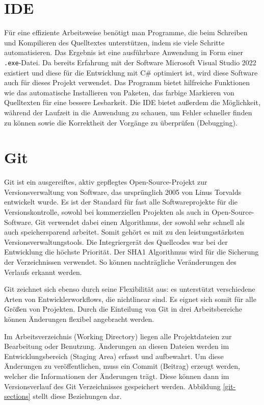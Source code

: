 \section{IDE}
Für eine effiziente Arbeitsweise benötigt man Programme, die beim Schreiben und Kompilieren des Quelltextes unterstützen, indem sie viele Schritte automatisieren.
Das Ergebnis ist eine ausführbare Anwendung in Form einer \texttt{.exe}-Datei. 
Da bereits Erfahrung mit der Software Microsoft Visual Studio 2022 existiert und diese für die Entwicklung mit C\# optimiert ist, wird diese Software auch für dieses Projekt verwendet. 
Das Programm bietet hilfreiche Funktionen wie das automatische Installieren von Paketen, das farbige Markieren von Quelltexten für eine bessere Lesbarkeit. 
Die IDE bietet außerdem die Möglichkeit, während der Laufzeit in die Anwendung zu schauen, um Fehler schneller finden zu können sowie die Korrektheit der Vorgänge zu überprüfen (Debugging).

\section{Git}
Git ist ein ausgereiftes, aktiv gepflegtes Open-Source-Projekt zur Versionsverwaltung von Software, das ursprünglich 2005 von Linus Torvalds entwickelt wurde.
Es ist der Standard für fast alle Softwareprojekte für die Versionskontrolle, sowohl bei kommerziellen Projekten als auch in Open-Source-Software.
Git verwendet dabei einen Algorithmus, der sowohl sehr schnell als auch speichersparend arbeitet.
Somit gehört es mit zu den leistungsstärksten Versionsverwaltungstools.
Die Integriergerät des Quellcodes war bei der Entwicklung die höchste Priorität. 
Der SHA1 Algorithmus wird für die Sicherung der Verzeichnissen verwendet. 
So können nachträgliche Veränderungen des Verlaufs erkannt werden.

Git zeichnet sich ebenso durch seine Flexibilität aus: es unterstützt verschiedene Arten von Entwicklerworkflows, die nichtlinear sind. 
Es eignet sich somit für alle Größen von Projekten.\cite{git}
Durch die Einteilung von Git in drei Arbeitsbereiche können Änderungen flexibel angebracht werden.

Im Arbeitsverzeichnis (Working Directory) liegen alle Projektdateien zur Bearbeitung oder Benutzung.
Änderungen an diesen Dateien werden im Entwicklungsbereich (Staging Area) erfasst und aufbewahrt.
Um diese Änderungen zu veröffentlichen, muss ein Commit (Beitrag) erzeugt werden, welcher die Informationen der Änderungen trägt.
Diese können dann im Versionsverlauf des Git Verzeichnisses gespeichert werden. Abbildung \vref{git-sections} stellt diese Beziehungen dar.

